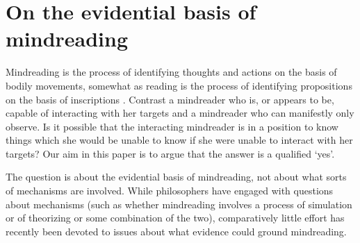 \documentclass[12pt,a4paper]{extarticle}
\begin{document}
\section{On the evidential basis of mindreading}
\label{sec:intro}

Mindreading is
the process of identifying thoughts and actions on the basis of bodily movements,
somewhat as reading is the process of identifying propositions on the basis of inscriptions \citep[p.\ 4]{Apperly:2010kx}.
Contrast
a mindreader who is, or appears to be, capable of interacting with her targets 
and
a mindreader who can manifestly only observe.
Is it possible that the interacting mindreader is in a position to know things which she would be unable to know if she were unable to interact with her targets?
Our aim in this paper is to argue that the answer is a qualified `yes'.

The question is about the evidential basis of mindreading, 
not about what sorts of mechanisms are involved.
While philosophers have engaged with questions about mechanisms (such as whether mindreading involves a process of simulation or of theorizing or some combination of the two),
comparatively little effort has recently been devoted to issues about what evidence could ground mindreading.
\end{document}
